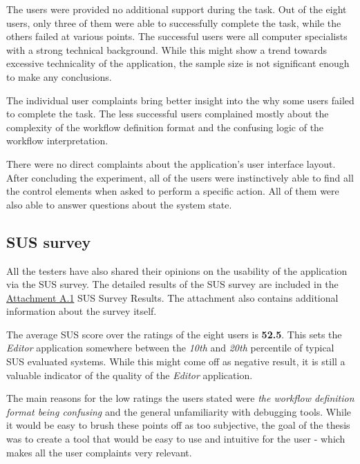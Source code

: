 The users were provided no additional support during the task.
Out of the eight users, only three of them were able to successfully complete the task, while the others failed at various points.
The successful users were all computer specialists with a strong technical background.
While this might show a trend towards excessive technicality of the application, the sample size is not significant enough to make any conclusions.

The individual user complaints bring better insight into the why some users failed to complete the task.
The less successful users complained mostly about the complexity of the workflow definition format and
the confusing logic of the workflow interpretation.

There were no direct complaints about the application's user interface layout. 
After concluding the experiment, all of the users were instinctively able to find all the control elements when asked to perform a specific action.
All of them were also able to answer questions about the system state.

\subsection{SUS survey}
All the testers have also shared their opinions on the usability of the application via the \ac{SUS} survey.
The detailed results of the \ac{SUS} survey are included in the \hyperref[sec:sussurvey]{Attachment A.1} SUS Survey Results.
The attachment also contains additional information about the survey itself.

The average \ac{SUS} score over the ratings of the eight users is \textbf{52.5}.
This sets the \textit{Editor} application somewhere between the \textit{10th} and \textit{20th} percentile of typical \ac{SUS} evaluated systems.
While this might come off as negative result, it is still a valuable indicator of the quality of the \textit{Editor} application.

The main reasons for the low ratings the users stated were \textit{the workflow definition format being confusing} and the general unfamiliarity with debugging tools. 
While it would be easy to brush these points off as too subjective, the goal of the thesis was to create a tool that would be easy to use and intuitive for the user -
which makes all the user complaints very relevant.
